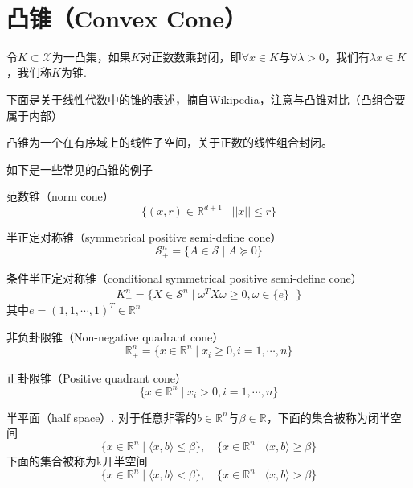  \section{凸锥（Convex Cone）}
\begin{definition}[凸锥]
	令$K\subset \mathcal{X}$为一凸集，如果$K$对正数数乘封闭，即$\forall x\in K$与$\forall \lambda > 0$，我们有$\lambda x\in K$，我们称$K$为锥.
\end{definition}
下面是关于线性代数中的锥的表述，摘自Wikipedia，注意与凸锥对比（凸组合要属于内部）
\begin{note}
	凸锥为一个在有序域上的线性子空间，关于正数的线性组合封闭。
\end{note}
如下是一些常见的凸锥的例子
\begin{example}
	范数锥（norm cone）
	\begin{equation*}
		\{ (x, r)\in \mathbb{R}^{d+1}\mid ||x||\leq r\}
	\end{equation*}
\end{example}
\begin{example}
	半正定对称锥（symmetrical positive semi-define cone）
	\begin{equation*}
		\mathcal{S}_+^n = \{A\in \mathcal{S}\mid A\succeq 0\}
	\end{equation*}
\end{example}
\begin{example}
	条件半正定对称锥（conditional symmetrical positive semi-define cone）
	\begin{equation*}
		K_+^n = \{X\in\mathcal{S}^n\mid \omega^T X\omega \geq 0, \omega \in \{e\}^\perp\}
	\end{equation*}
	其中$e = (1,1,\cdots, 1)^T\in \mathbb{R}^n$
\end{example}
\begin{example}
	非负卦限锥（Non-negative quadrant cone）
	\begin{equation*}
		\mathbb{R}_+^n = \{x\in\mathbb{R}^n\mid x_i\geq 0, i = 1,\cdots, n\}
	\end{equation*}
\end{example}
\begin{example}
	正卦限锥（Positive quadrant cone）
	\begin{equation*}
		\{x\in\mathbb{R}^n\mid x_i > 0, i = 1,\cdots, n\}
	\end{equation*}
\end{example}
\begin{example}
	半平面（half space）.
	对于任意非零的$b\in \mathbb{R}^n$与$\beta \in \mathbb{R}$，下面的集合被称为闭半空间
	\begin{equation*}
		\{x\in\mathbb{R}^n\mid \langle x, b\rangle\leq \beta\},\quad \{x\in\mathbb{R}^n\mid \langle x, b\rangle\geq \beta\}
	\end{equation*}
	下面的集合被称为k开半空间
	\begin{equation*}
		\{x\in\mathbb{R}^n\mid \langle x, b\rangle< \beta\},\quad \{x\in\mathbb{R}^n\mid \langle x, b\rangle> \beta\}
	\end{equation*}
\end{example}
